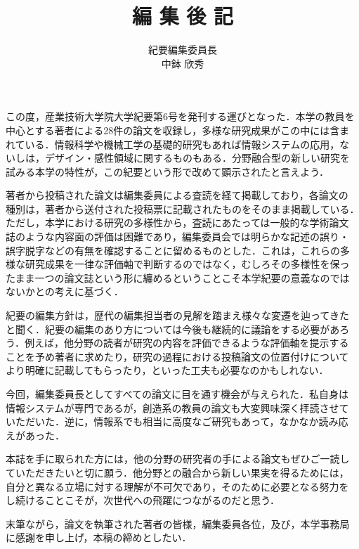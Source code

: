 \documentclass[a4j,14Q, twoside]{jsarticle}
\title{編 集 後 記}
\author{紀要編集委員長\\中鉢 欣秀}
\date{}
\begin{document}
\pagestyle{empty}
\maketitle

この度，産業技術大学院大学紀要第6号を発刊する運びとなった．本学の教員を
中心とする著者による28件の論文を収録し，多様な研究成果がこの中には含ま
れている．情報科学や機械工学の基礎的研究もあれば情報システムの応用，な
いしは，デザイン・感性領域に関するものもある．分野融合型の新しい研究を
試みる本学の特性が，この紀要という形で改めて顕示されたと言えよう．

著者から投稿された論文は編集委員による査読を経て掲載しており，各論文の
種別は，著者から送付された投稿票に記載されたものをそのまま掲載している．
ただし，本学における研究の多様性から，査読にあたっては一般的な学術論文
誌のような内容面の評価は困難であり，編集委員会では明らかな記述の誤り・
誤字脱字などの有無を確認することに留めるものとした．これは，これらの多
様な研究成果を一律な評価軸で判断するのではなく，むしろその多様性を保っ
たまま一つの論文誌という形に纏めるということこそ本学紀要の意義なのでは
ないかとの考えに基づく．

紀要の編集方針は，歴代の編集担当者の見解を踏まえ様々な変遷を辿ってきた
と聞く．紀要の編集のあり方については今後も継続的に議論をする必要があろ
う．例えば，他分野の読者が研究の内容を評価できるような評価軸を提示する
ことを予め著者に求めたり，研究の過程における投稿論文の位置付けについて
より明確に記載してもらったり，といった工夫も必要なのかもしれない．

今回，編集委員長としてすべての論文に目を通す機会が与えられた．私自身は
情報システムが専門であるが，創造系の教員の論文も大変興味深く拝読させて
いただいた．逆に，情報系でも相当に高度なご研究もあって，なかなか読み応
えがあった．

本誌を手に取られた方には，他の分野の研究者の手による論文もぜひご一読し
ていただきたいと切に願う．他分野との融合から新しい果実を得るためには，
自分と異なる立場に対する理解が不可欠であり，そのために必要となる努力を
し続けることこそが，次世代への飛躍につながるのだと思う．

末筆ながら，論文を執筆された著者の皆様，編集委員各位，及び，本学事務局
に感謝を申し上げ，本稿の締めとしたい．
\end{document}
